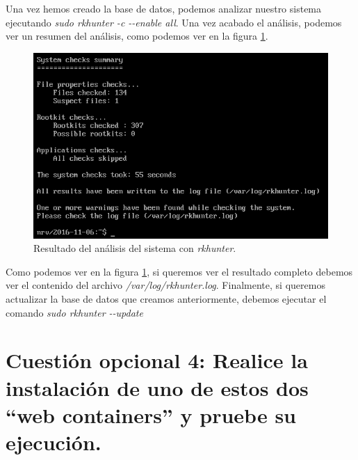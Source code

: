 \documentclass[a4paper,titlepage,12pt]{scrartcl}	%
\numberwithin{figure}{section} %
\numberwithin{table}{section} %
\begin{document}
	Una vez hemos creado la base de datos, podemos analizar nuestro sistema ejecutando \textit{sudo rkhunter -c {-}-enable all}. Una vez acabado el análisis, podemos ver un resumen del análisis, como podemos ver en la figura \ref{O3-analisis}.
	\begin{figure}[H]
		\centering
		\includegraphics[scale=0.75]{./Imagenes/O3-analisis.png}
		\caption[Resultado del análisis del sistema con \textit{rkhunter}.]{Resultado del análisis del sistema con \textit{rkhunter}.}
		\label{O3-analisis}
	\end{figure}
	
	Como podemos ver en la figura \ref{O3-analisis}, si queremos ver el resultado completo debemos ver el contenido del archivo \textit{/var/log/rkhunter.log}. Finalmente, si queremos actualizar la base de datos que creamos anteriormente, debemos ejecutar el comando \textit{sudo rkhunter {-}-update}
	
	\section[Cuestión opcional 4: Realice la instalación de uno de estos dos “web containers” y pruebe su ejecución.]{Cuestión opcional 4: Realice la instalación de uno de estos dos “web containers” y pruebe su ejecución.}
	
\end{document}
